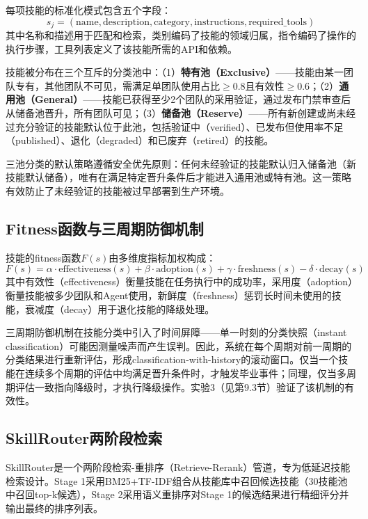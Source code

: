 \documentclass[12pt,a4paper]{ctexart}
\begin{document}
每项技能的标准化模式包含五个字段：
\begin{equation}
s_j = (\text{name}, \text{description}, \text{category}, \text{instructions}, \text{required\_tools})
\label{eq:skill_schema}
\end{equation}
其中名称和描述用于匹配和检索，类别编码了技能的领域归属，指令编码了操作的执行步骤，工具列表定义了该技能所需的API和依赖。

技能被分布在三个互斥的分类池中：（1）\textbf{特有池（Exclusive）}——技能由某一团队专有，其他团队不可见，需满足单团队使用占比$\geq 0.8$且有效性$\geq 0.6$；（2）\textbf{通用池（General）}——技能已获得至少2个团队的采用验证，通过发布门禁审查后从储备池晋升，所有团队可见；（3）\textbf{储备池（Reserve）}——所有新创建或尚未经过充分验证的技能默认位于此池，包括验证中（verified）、已发布但使用率不足（published）、退化（degraded）和已废弃（retired）的技能。

三池分类的默认策略遵循安全优先原则：任何未经验证的技能默认归入储备池（新技能默认储备），唯有在满足特定晋升条件后才能进入通用池或特有池。这一策略有效防止了未经验证的技能被过早部署到生产环境。

\subsection{Fitness函数与三周期防御机制}

技能的fitness函数$F(s)$由多维度指标加权构成：
\begin{equation}
F(s) = \alpha \cdot \text{effectiveness}(s) + \beta \cdot \text{adoption}(s) + \gamma \cdot \text{freshness}(s) - \delta \cdot \text{decay}(s)
\label{eq:fitness}
\end{equation}
其中有效性（effectiveness）衡量技能在任务执行中的成功率，采用度（adoption）衡量技能被多少团队和Agent使用，新鲜度（freshness）惩罚长时间未使用的技能，衰减度（decay）用于退化技能的降级处理。

三周期防御机制在技能分类中引入了时间屏障——单一时刻的分类快照（instant classification）可能因测量噪声而产生误判。因此，系统在每个周期对前一周期的分类结果进行重新评估，形成classification-with-history的滚动窗口。仅当一个技能在连续多个周期的评估中均满足晋升条件时，才触发毕业事件；同理，仅当多周期评估一致指向降级时，才执行降级操作。实验3（见第9.3节）验证了该机制的有效性。

\subsection{SkillRouter两阶段检索}

SkillRouter是一个两阶段检索-重排序（Retrieve-Rerank）管道，专为低延迟技能检索设计。Stage 1采用BM25+TF-IDF组合从技能库中召回候选技能（30技能池中召回top-k候选），Stage 2采用语义重排序对Stage 1的候选结果进行精细评分并输出最终的排序列表。
\end{document}

